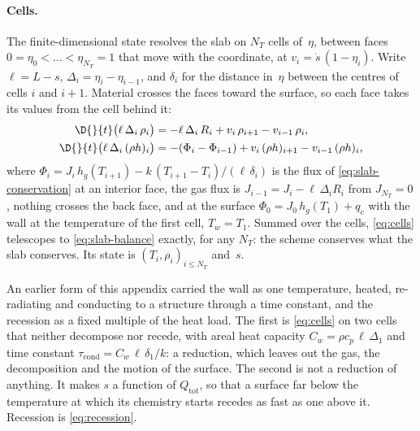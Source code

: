 \paragraph{Cells.}
The finite-dimensional state resolves the slab on $N_T$ cells of~$\eta$,
between faces $0 = \eta_0 < \dots < \eta_{N_T} = 1$ that move with the
coordinate, at $v_i = \dot s\,(1-\eta_i)$. Write $\ell = L - s$,
$\Delta_i = \eta_i - \eta_{i-1}$, and $\delta_i$ for the distance in~$\eta$
between the centres of cells $i$ and $i+1$. Material crosses the faces
toward the surface, so each face takes its values from the cell behind it:
\begin{equation}\label{eq:cells}
\begin{aligned}
  \D{}{t}\bigl(\ell\,\Delta_i\,\rho_i\bigr)
    &= -\ell\,\Delta_i\,R_i + v_i\,\rho_{i+1} - v_{i-1}\,\rho_i ,\\
  \D{}{t}\bigl(\ell\,\Delta_i\,(\rho h)_i\bigr)
    &= -(\Phi_i - \Phi_{i-1}) + v_i\,(\rho h)_{i+1} - v_{i-1}\,(\rho h)_i ,
\end{aligned}
\end{equation}
where $\Phi_i = J_i\,h_g(T_{i+1}) - k\,(T_{i+1}-T_i)/(\ell\,\delta_i)$ is the
flux of \cref{eq:slab-conservation} at an interior face, the gas flux is
$J_{i-1} = J_i - \ell\,\Delta_i R_i$ from $J_{N_T} = 0$, nothing crosses the
back face, and at the surface $\Phi_0 = J_0\,h_g(T_1) + q_c$ with the wall
at the temperature of the first cell, $T_w = T_1$. Summed over the cells,
\cref{eq:cells} telescopes to \cref{eq:slab-balance} exactly, for any
$N_T$: the scheme conserves what the slab conserves. Its state is
$(T_i,\rho_i)_{i\le N_T}$ and~$s$.

\begin{remark}\label{rem:lumped-wall}
An earlier form of this appendix carried the wall as one temperature,
heated, re-radiating and conducting to a structure through a time constant,
and the recession as a fixed multiple of the heat load. The first is
\cref{eq:cells} on two cells that neither decompose nor recede, with areal
heat capacity $C_w = \rho c_p\,\ell\,\Delta_1$ and time constant
$\tau_{\mathrm{cond}} = C_w\,\ell\,\delta_1/k$: a reduction, which leaves
out the gas, the decomposition and the motion of the surface. The second is
not a reduction of anything. It makes $s$ a function of $Q_{\mathrm{tot}}$,
so that a surface far below the temperature at which its chemistry starts
recedes as fast as one above it. Recession is \cref{eq:recession}.
\end{remark}


